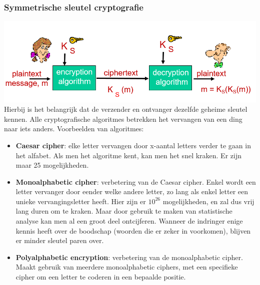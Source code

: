 \subsubsection{Symmetrische sleutel cryptografie}
\includegraphics[width=7in]{./img/imghfdst8/hfdst8puntje3.png}\\[1cm]
Hierbij is het belangrijk dat de verzender en ontvanger dezelfde geheime sleutel kennen.
Alle cryptografische algoritmes betrekken het vervangen van een ding naar iets anders.
Voorbeelden van algoritmes:
\begin{itemize}
    \item \textbf{Caesar cipher}: elke letter vervangen door x-aantal letters verder te gaan in het alfabet. Als men het algoritme kent, kan men het snel kraken. Er zijn maar 25 mogelijkheden.
    \item \textbf{Monoalphabetic cipher}: verbetering van de Caesar cipher. Enkel wordt een letter vervanger door eender welke andere letter, zo lang als enkel letter een unieke vervangingsletter heeft. Hier zijn er $10^{26}$ mogelijkheden, en zal dus vrij lang duren om te kraken. Maar door gebruik te maken van statistische analyse kan men al een groot deel ontcijferen. Wanneer de indringer enige kennis heeft over de boodschap (woorden die er zeker in voorkomen), blijven er minder sleutel paren over.
    \item \textbf{Polyalphabetic encryption}: verbetering van de monoalphabetic cipher. Maakt gebruik van meerdere monoalphabetic ciphers, met een specifieke cipher om een letter te coderen in een bepaalde positie.
\end{itemize}

\clearpage


